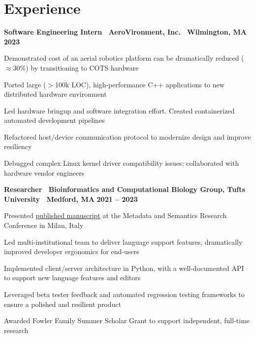 \documentclass[10pt]{article}
\newenvironment{mylist}[1][]
{\itemize[nosep, wide=0pt, leftmargin=*, after=\strut]}
{\enditemize}
\begin{document}
\section{Experience}
\begin{minipage}[t]{\linewidth}
    \textbf{Software Engineering Intern \textbar \ AeroVironment, Inc. \textbar \ Wilmington, MA} \hfill \textbf{2023} 
    \begin{mylist}
        \item Demonstrated cost of an aerial robotics platform can be dramatically reduced ($\approx$30\%) by transitioning to COTS hardware
        \item Ported large ($>$100k LOC), high-performance C++ applications to new distributed hardware environment
        \item Led hardware bringup and software integration effort. Created containerized automated development pipelines
        \item Refactored host/device communication protocol to modernize design and improve resiliency
        \item Debugged complex Linux kernel driver compatibility issues; collaborated with hardware vendor engineers
    \end{mylist}
\end{minipage}

\begin{minipage}[t]{\linewidth}
    \textbf{Researcher \textbar \ Bioinformatics and Computational Biology Group, Tufts University \textbar \ Medford, MA} \hfill \textbf{2021 -- 2023}
    \begin{mylist}
        \item Presented \href{https://link.springer.com/chapter/10.1007/978-3-031-65990-4_25}{published manuscript} at the Metadata and Semantics Research Conference in Milan, Italy
        \item Led multi-institutional team to deliver language support features, dramatically improved developer ergonomics for end-users
        \item Implemented client/server architecture in Python, with a well-documented API to support new language features and editors
        \item Leveraged beta tester feedback and automated regression testing frameworks to ensure a polished and resilient product
        \item Awarded Fowler Family Summer Scholar Grant to support independent, full-time research
    \end{mylist}
\end{minipage}
\end{document}
